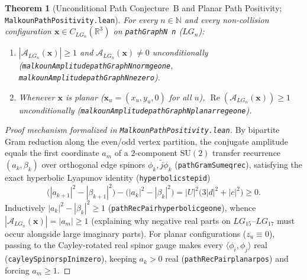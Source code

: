\documentclass[11pt]{amsart}
\renewcommand{\_}{\origunderscore\penalty0\relax}
\theoremstyle{plain}
\newtheorem{theorem}{Theorem}[section]
\theoremstyle{definition}
\theoremstyle{remark}
\newcommand{\R}{\mathbb{R}}
\DeclareMathOperator{\RePart}{Re}
\begin{document}
\begin{theorem}[Unconditional Path Conjecture~B and Planar Path Positivity; \texttt{MalkounPathPositivity.lean}]\label{thm:path_positivity}
For every $n \in \mathbb{N}$ and every non-collision configuration $\mathbf{x} \in C_{LG_n}(\R^3)$ on \texttt{pathGraphN n} ($LG_n$):
\begin{enumerate}
    \item $|\mathcal{A}_{LG_n}(\mathbf{x})| \ge 1$ and $\mathcal{A}_{LG_n}(\mathbf{x}) \neq 0$ unconditionally (\texttt{malkounAmplitude\_pathGraphN\_norm\_ge\_one}, \texttt{malkounAmplitude\_pathGraphN\_ne\_zero}).
    \item Whenever $\mathbf{x}$ is planar ($\mathbf{x}_u = (x_u, y_u, 0)$ for all $u$), $\RePart(\mathcal{A}_{LG_n}(\mathbf{x})) \ge 1$ unconditionally (\texttt{malkounAmplitude\_pathGraphN\_planar\_re\_ge\_one}).
\end{enumerate}
\end{theorem}

\begin{proof}[Proof mechanism formalized in \texttt{MalkounPathPositivity.lean}]
By bipartite Gram reduction along the even/odd vertex partition, the conjugate amplitude equals the first coordinate $a_m$ of a $2$-component $\mathrm{SU}(2)$ transfer recurrence $(a_k, \beta_k)$ over orthogonal edge spinors $\phi_k, \tilde{j}\phi_k$ (\texttt{pathGramSum\_eq\_rec}), satisfying the exact hyperbolic Lyapunov identity (\texttt{hyperbolic\_step\_id})
\[
    \bigl(|a_{k+1}|^2 - |\beta_{k+1}|^2\bigr) - \bigl(|a_k|^2 - |\beta_k|^2\bigr) = |U|^2\bigl(3|d|^2 + |c|^2\bigr) \ge 0.
\]
Inductively $|a_k|^2 - |\beta_k|^2 \ge 1$ (\texttt{pathRecPair\_hyperbolic\_ge\_one}), whence $|\mathcal{A}_{LG_n}(\mathbf{x})| = |a_m| \ge 1$ (explaining why negative real parts on $LG_{15}$--$LG_{17}$ must occur alongside large imaginary parts). For planar configurations ($z_u \equiv 0$), passing to the Cayley-rotated real spinor gauge makes every $\langle \phi_i, \phi_j \rangle$ real (\texttt{cayleySpinor\_spIn\_im\_zero}), keeping $a_k > 0$ real (\texttt{pathRecPair\_planar\_pos}) and forcing $a_m \ge 1$.
\end{proof}
\end{document}

